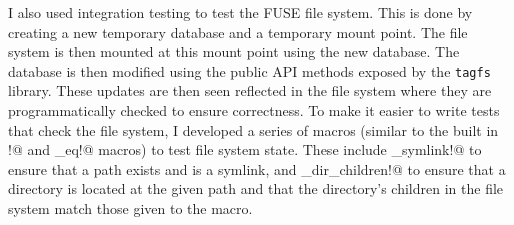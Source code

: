 I also used integration testing to test the FUSE file system. This is done by
creating a new temporary database and a temporary mount point. The file system
is then mounted at this mount point using the new database. The database is
then modified using the public API methods exposed by the \texttt{tagfs}
library. These updates are then seen reflected in the file system where they
are programmatically checked to ensure correctness. To make it easier to write
tests that check the file system, I developed a series of macros (similar to
the built in \verb@assert!@ and \verb@assert_eq!@ macros) to test file system
state. These include \verb@assert_symlink!@ to ensure that a path exists and is
a symlink, and \verb@assert_dir_children!@ to ensure that a directory is
located at the given path and that the directory's children in the file system
match those given to the macro.

